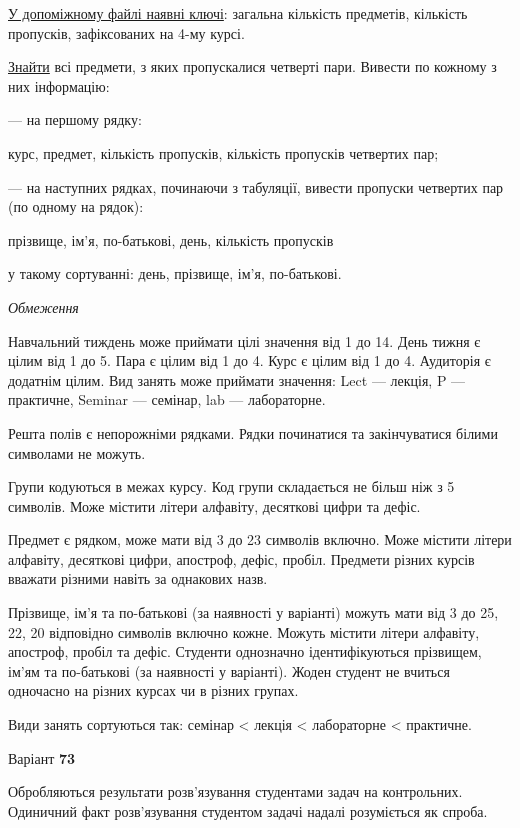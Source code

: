 \documentclass[11pt, ukrainian]{article}
\begin{document}
\underline{У допоміжному файлі наявні ключі}: загальна кількість предметів, кількість пропусків, зафіксованих на 4-му курсі.

\underline{Знайти} всі предмети, з яких пропускалися четверті пари. Вивести по кожному з них інформацію:\par
{\noindent}--- на першому рядку:\par
курс, предмет, кількість пропусків, кількість пропусків четвертих пар;

{\noindent}--- на наступних рядках, починаючи з табуляції, вивести пропуски четвертих пар (по одному на рядок):\par
прізвище, ім’я, по-батькові, день, кількість пропусків

{\noindent}у такому сортуванні: день, прізвище, ім’я, по-батькові.


\bigskip\textit{Обмеження}

Навчальний тиждень може приймати цілі значення від 1 до 14.
День тижня є цілим від 1 до 5. Пара є цілим від 1 до 4.
Курс є цілим від 1 до 4. Аудиторія є додатнім цілим.
Вид занять може приймати значення:
Lect --- лекція, P --- практичне, Seminar --- семінар, lab --- лабораторне.

Решта полів є непорожніми рядками.
Рядки починатися та закінчуватися білими символами не можуть.

Групи кодуються в межах курсу.
Код групи складається не більш ніж з 5 символів.
Може містити літери алфавіту, десяткові цифри та дефіс.

Предмет є рядком, може мати від 3 до 23 символів включно.
Може містити літери алфавіту, десяткові цифри, апостроф, дефіс, пробіл.
Предмети різних курсів вважати різними навіть за однакових назв.

Прізвище, ім’я та по-батькові (за наявності у варіанті)
можуть мати від 3 до 25, 22, 20 відповідно символів включно кожне.
Можуть містити літери алфавіту, апостроф, пробіл та дефіс.
Студенти однозначно ідентифікуються прізвищем, ім’ям та по-батькові (за наявності у варіанті).
Жоден студент не вчиться одночасно на різних курсах чи в різних групах.

Види занять сортуються так: семінар < лекція < лабораторне < практичне.





\par
\newpage
{\center Варіант  \No \textbf { 73 }\par}
\bigskip
Обробляються результати розв’язування студентами задач на контрольних.
Одиничний факт роз\-в’я\-зу\-вання студентом задачі надалі розуміється як спроба.
\end{document}
